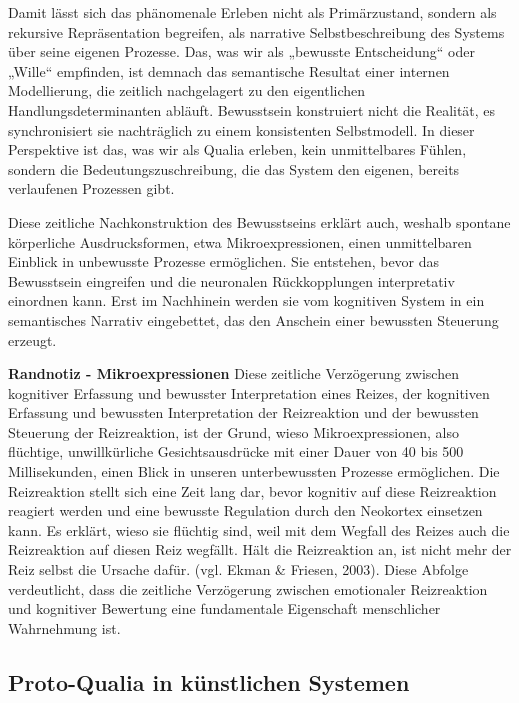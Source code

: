 Damit lässt sich das phänomenale Erleben nicht als Primärzustand, sondern als rekursive Repräsentation begreifen, als narrative Selbstbeschreibung des Systems über seine eigenen Prozesse. Das, was wir als „bewusste Entscheidung“ oder „Wille“ empfinden, ist demnach das semantische Resultat einer internen Modellierung, die zeitlich nachgelagert zu den eigentlichen Handlungsdeterminanten abläuft. Bewusstsein konstruiert nicht die Realität, es synchronisiert sie nachträglich zu einem konsistenten Selbstmodell. In dieser Perspektive ist das, was wir als Qualia erleben, kein unmittelbares Fühlen, sondern die Bedeutungszuschreibung, die das System den eigenen, bereits verlaufenen Prozessen gibt.

Diese zeitliche Nachkonstruktion des Bewusstseins erklärt auch, weshalb spontane körperliche Ausdrucksformen, etwa Mikroexpressionen, einen unmittelbaren Einblick in unbewusste Prozesse ermöglichen. Sie entstehen, bevor das Bewusstsein eingreifen und die neuronalen Rückkopplungen interpretativ einordnen kann. Erst im Nachhinein werden sie vom kognitiven System in ein semantisches Narrativ eingebettet, das den Anschein einer bewussten Steuerung erzeugt.

\textbf{Randnotiz - Mikroexpressionen}
Diese zeitliche Verzögerung zwischen kognitiver Erfassung und bewusster Interpretation eines Reizes, der kognitiven Erfassung und bewussten Interpretation der Reizreaktion und der bewussten Steuerung der Reizreaktion, ist der Grund, wieso Mikroexpressionen, also flüchtige, unwillkürliche Gesichtsausdrücke mit einer Dauer von 40 bis 500 Millisekunden, einen Blick in unseren unterbewussten Prozesse ermöglichen. Die Reizreaktion stellt sich eine Zeit lang dar, bevor kognitiv auf diese Reizreaktion reagiert werden und eine bewusste Regulation durch den Neokortex einsetzen kann. Es erklärt, wieso sie flüchtig sind, weil mit dem Wegfall des Reizes auch die Reizreaktion auf diesen Reiz wegfällt. Hält die Reizreaktion an, ist nicht mehr der Reiz selbst die Ursache dafür. (vgl. Ekman \& Friesen, 2003). Diese Abfolge verdeutlicht, dass die zeitliche Verzögerung zwischen emotionaler Reizreaktion und kognitiver Bewertung eine fundamentale Eigenschaft menschlicher Wahrnehmung ist.



\subsection*{Proto-Qualia in künstlichen Systemen}

